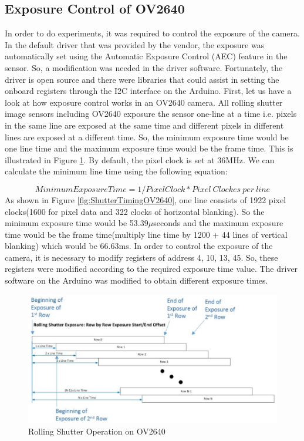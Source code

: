 \subsection{Exposure Control of OV2640}
In order to do experiments, it was required to control the exposure of the camera. In the default driver that was provided by the vendor, the exposure was automatically set using the Automatic Exposure Control (AEC) feature in the sensor. So, a modification was needed in the driver software. Fortunately, the driver is open source and there were libraries that could assist in setting the onboard registers through the I2C interface on the Arduino. First, let us have a look at how exposure control works in an OV2640 camera. All rolling shutter image sensors including OV2640 exposure the sensor one-line at a time i.e. pixels in the same line are exposed at the same time and different pixels in different lines are exposed at a different time. So, the minimum exposure time would be one line time and the maximum exposure time would be the frame time. This is illustrated in Figure \ref{fig:RollingShutterOV2640}. By default, the pixel clock is set at 36MHz. We can calculate the minimum line time using the following equation:

$$
Minimum Exposure Time = 1/Pixel Clock * Pixel \ Clockes \ per \ line 
$$
As shown in Figure \ref{fig:ShutterTimingOV2640}, one line consists of 1922 pixel clocks(1600 for pixel data and 322 clocks of horizontal blanking). So the minimum exposure time would be 53.39$\mu$seconds and the maximum exposure time would be the frame time(multiply line time by 1200 + 44 lines of vertical blanking) which would be 66.63ms\cite{RollingShutterOV2640}. In order to control the exposure of the camera, it is necessary to modify registers of address 4, 10, 13, 45. So, these registers were modified according to the required exposure time value. The driver software on the Arduino was modified to obtain different exposure times.
\begin{figure}[ht]
\includegraphics[width=\textwidth]{pics/rolling_shutter}
\caption{Rolling Shutter Operation on OV2640\cite{RollingShutterOV2640}}
\label{fig:RollingShutterOV2640}
\end{figure}

